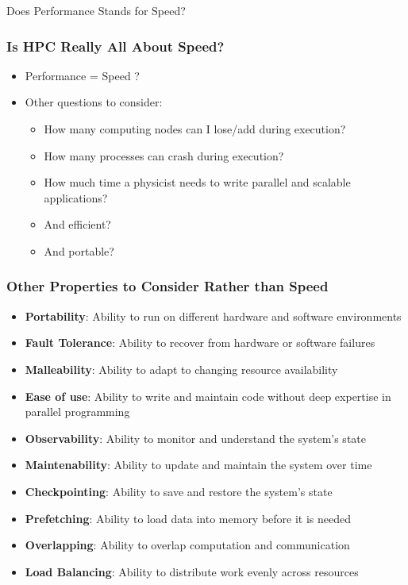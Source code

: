 \documentclass[10pt,aspectratio=1609]{beamer}
\begin{document}
\begin{section}{Does Performance Stands for Speed?}
 \begin{frame}
   \frametitle{Is HPC Really All About Speed?}
   \begin{itemize}
     \item Performance = Speed ?
     \item Other questions to consider:
           \begin{itemize}
             \item How many computing nodes can I lose/add during execution?
             \item How many processes can crash during execution?
             \item How much time a physicist needs to write parallel and scalable applications?
             \item And efficient?
             \item And portable?
           \end{itemize}
   \end{itemize}
 \end{frame}

 \begin{frame}
   \frametitle{Other Properties to Consider Rather than Speed}
   \begin{itemize}
     \item \textbf{Portability}: Ability to run on different hardware and software environments
     \item \textbf{Fault Tolerance}: Ability to recover from hardware or software failures
     \item \textbf{Malleability}: Ability to adapt to changing resource availability
     \item \textbf{Ease of use}: Ability to write and maintain code without deep expertise in parallel programming
     \item \textbf{Observability}: Ability to monitor and understand the system's state
     \item \textbf{Maintenability}: Ability to update and maintain the system over time
     \item \textbf{Checkpointing}: Ability to save and restore the system's state
     \item \textbf{Prefetching}: Ability to load data into memory before it is needed
     \item \textbf{Overlapping}: Ability to overlap computation and communication
     \item \textbf{Load Balancing}: Ability to distribute work evenly across resources
   \end{itemize}
 \end{frame}
\end{section}
\end{document}
